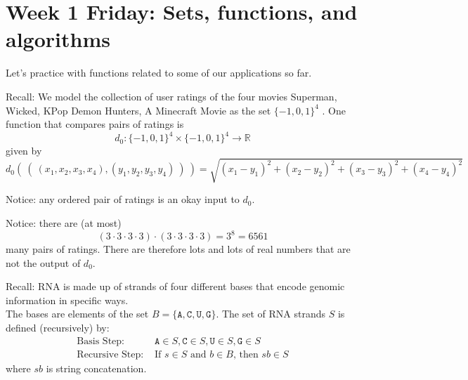 \documentclass[12pt, oneside]{article}
\newcommand{\A}[0]{\texttt{A}}
\newcommand{\C}[0]{\texttt{C}}
\newcommand{\G}[0]{\texttt{G}}
\newcommand{\U}[0]{\texttt{U}}
\begin{document}

 
\section*{Week 1 Friday: Sets, functions, and algorithms}


Let's practice with functions related to some of our applications so far.

Recall: We model the collection of user ratings of the four movies Superman, Wicked, KPop Demon Hunters, A Minecraft Movie as the set
$\{-1,0,1\}^4$ . One function that compares pairs of ratings is
$$d_0: \{-1,0,1\}^4 \times \{-1,0,1\}^4 \to \mathbb{R}$$
given by
\[
d_0 (~(~ (x_1, x_2, x_3, x_4), (y_1, y_2, y_3, y_4) ~) ~) = \sqrt{ (x_1 - y_1)^2 + (x_2 - y_2)^2 + (x_3 -y_3)^2 + (x_4 -y_4)^2}
\]

Notice: any ordered pair of ratings is an okay input to $d_0$.

Notice: there are (at most) 
\[
(3 \cdot 3 \cdot 3 \cdot 3)\cdot (3 \cdot 3 \cdot 3 \cdot 3) = 3^8 = 6561
\]
many pairs of ratings. There are therefore lots and lots of real numbers that are not the output of $d_0$.

\vfill

Recall: RNA is made up of strands of four different bases that encode genomic information
in specific ways.\\
The bases are elements of the set 
$B  = \{\A, \C, \U, \G \}$. The set of RNA strands $S$ is defined (recursively) by:
\[
\begin{array}{ll}
\textrm{Basis Step: } & \A \in S, \C \in S, \U \in S, \G \in S \\
\textrm{Recursive Step: } & \textrm{If } s \in S\textrm{ and }b \in B \textrm{, then }sb \in S
\end{array}
\]
where $sb$ is string concatenation.
\end{document}
